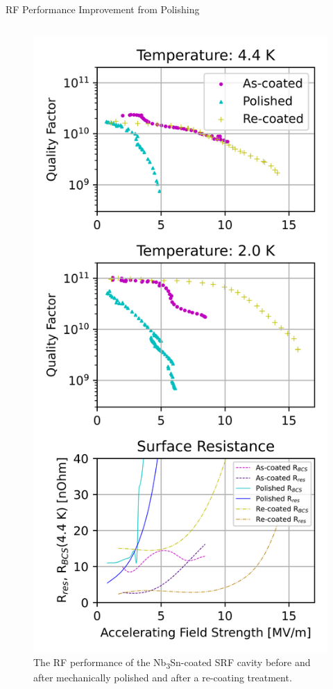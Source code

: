 \documentclass{beamer}
\begin{document}
\begin{frame}{}
\begin{columns}[t]
\begin{column}{0.32\textwidth}
\begin{block}{\label{sec:cavitycbp}RF Performance Improvement from Polishing}
\begin{columns}
\begin{column}{0.5\columnwidth}
\begin{figure}[t]
                                \includegraphics[width=\columnwidth]{../doc/figs/VTS_Test_Graph.png}%
                                \caption{\label{fig:vtstestgraph}The RF performance of the Nb\textsubscript{3}Sn-coated SRF cavity before and after mechanically polished and after a re-coating treatment.}

\end{figure}
\end{column}
\end{columns}
\end{block}
\end{column}
\end{columns}
\end{frame}
\end{document}
